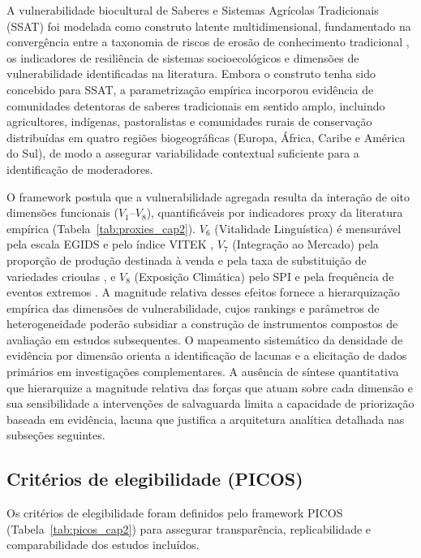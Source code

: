 A vulnerabilidade biocultural de Saberes e Sistemas Agrícolas Tradicionais (SSAT) foi modelada como construto latente multidimensional, fundamentado na convergência entre a taxonomia de riscos de erosão de conhecimento tradicional \cite{Agrawal2002}, os indicadores de resiliência de sistemas socioecológicos \cite{Folke2016} e dimensões de vulnerabilidade identificadas na literatura. Embora o construto tenha sido concebido para SSAT, a parametrização empírica incorporou evidência de comunidades detentoras de saberes tradicionais em sentido amplo, incluindo agricultores, indígenas, pastoralistas e comunidades rurais de conservação distribuídas em quatro regiões biogeográficas (Europa, África, Caribe e América do Sul), de modo a assegurar variabilidade contextual suficiente para a identificação de moderadores.

O framework postula que a vulnerabilidade agregada resulta da interação de oito dimensões funcionais ($V_1$--$V_8$), quantificáveis por indicadores proxy da literatura empírica (Tabela~\ref{tab:proxies_cap2}). $V_6$ (Vitalidade Linguística) é mensurável pela escala EGIDS \cite{LewisSiomns2010} e pelo índice VITEK \cite{ZentMaffi2009}, $V_7$ (Integração ao Mercado) pela proporção de produção destinada à venda e pela taxa de substituição de variedades crioulas \cite{Godoy2005,ReyesGarcia2013}, e $V_8$ (Exposição Climática) pelo SPI e pela frequência de eventos extremos \cite{Savo2016}. A magnitude relativa desses efeitos fornece a hierarquização empírica das dimensões de vulnerabilidade, cujos rankings e parâmetros de heterogeneidade poderão subsidiar a construção de instrumentos compostos de avaliação em estudos subsequentes. O mapeamento sistemático da densidade de evidência por dimensão orienta a identificação de lacunas e a elicitação de dados primários em investigações complementares. A ausência de síntese quantitativa que hierarquize a magnitude relativa das forças que atuam sobre cada dimensão e sua sensibilidade a intervenções de salvaguarda limita a capacidade de priorização baseada em evidência, lacuna que justifica a arquitetura analítica detalhada nas subseções seguintes.

\subsection{Critérios de elegibilidade (PICOS)}
\label{sec:picos_cap2}

Os critérios de elegibilidade foram definidos pelo framework PICOS (Tabela~\ref{tab:picos_cap2}) para assegurar transparência, replicabilidade e comparabilidade dos estudos incluídos.

